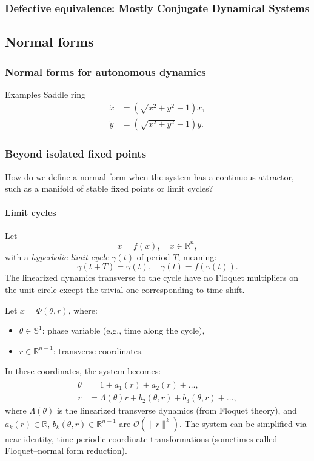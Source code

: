 \documentclass{article}
\theoremstyle{definition} \newtheorem{definition}{Definition}  \newtheorem{example}{Example}
\theoremstyle{remark} \newtheorem{remark}{Remark}
\newcounter{ct}
\begin{document}
\subsubsection{Defective equivalence: Mostly Conjugate Dynamical Systems}
\citep{skufca2007relaxing, skufca2008mostlyconjugate, bollt2010comparing}



\subsection{Normal forms}

\subsubsection{Normal forms for autonomous dynamics}%
Examples
Saddle ring
\begin{equation}
\begin{aligned}
\dot{x} &= (\sqrt{x^2 + y^2} - 1) x, \\
\dot{y} &= (\sqrt{x^2 + y^2} - 1) y.
\end{aligned}
\end{equation}


\subsubsection{Beyond isolated fixed points}
How do we define a normal form when the system has a continuous attractor, such as a manifold of stable fixed points or limit cycles?
\paragraph{Limit cycles}%
Let 
\[
\dot{x} = f(x), \quad x \in \mathbb{R}^n,
\]
with a \emph{hyperbolic limit cycle} \( \gamma(t) \) of period \( T \), meaning:
\[
\gamma(t + T) = \gamma(t), \quad \dot{\gamma}(t) = f(\gamma(t)).
\]
The linearized dynamics transverse to the cycle have no Floquet multipliers on the unit circle except the trivial one corresponding to time shift.

Let \( x = \Phi(\theta, r) \), where: %
\begin{itemize}
  \item \( \theta \in \mathbb{S}^1 \): phase variable (e.g., time along the cycle),
  \item \( r \in \mathbb{R}^{n-1} \): transverse coordinates.
\end{itemize}
In these coordinates, the system becomes:
\[
\begin{aligned}
\dot{\theta} &= 1 + a_1(r) + a_2(r) + \dots, \\
\dot{r} &= \Lambda(\theta) r + b_2(\theta, r) + b_3(\theta, r) + \dots,
\end{aligned}
\]
where \( \Lambda(\theta) \) is the linearized transverse dynamics (from Floquet theory),
and  \( a_k(r) \in \mathbb{R} \), \( b_k(\theta, r) \in \mathbb{R}^{n-1} \) are \( \mathcal{O}(\|r\|^k) \).
The system can be simplified via near-identity, time-periodic coordinate transformations (sometimes called Floquet–normal form reduction).
\end{document}
